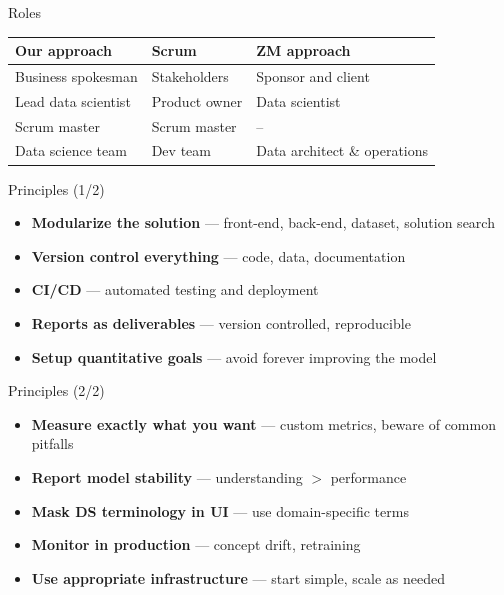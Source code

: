 \begin{frame}{Roles}
  \centering
  \small
  \begin{tabular}{lll}
    \toprule
    \textbf{Our approach} & \textbf{Scrum} & \textbf{ZM approach} \\
    \midrule
    Business spokesman  & Stakeholders  & Sponsor and client \\
    Lead data scientist & Product owner & Data scientist \\
    Scrum master        & Scrum master  & -- \\
    Data science team   & Dev team      & Data architect \& operations \\
    \bottomrule
  \end{tabular}
\end{frame}

\begin{frame}{Principles (1/2)}
  \begin{itemize}
    \item \textbf{Modularize the solution} --- front-end, back-end, dataset,
      solution search
    \item \textbf{Version control everything} --- code, data, documentation
    \item \textbf{CI/CD} --- automated testing and deployment
    \item \textbf{Reports as deliverables} --- version controlled, reproducible
    \item \textbf{Setup quantitative goals} --- avoid forever improving the model
  \end{itemize}
\end{frame}

\begin{frame}{Principles (2/2)}
  \begin{itemize}
    \item \textbf{Measure exactly what you want} --- custom metrics, beware of
      common pitfalls
    \item \textbf{Report model stability} --- understanding $>$ performance
    \item \textbf{Mask DS terminology in UI} --- use domain-specific terms
    \item \textbf{Monitor in production} --- concept drift, retraining
    \item \textbf{Use appropriate infrastructure} --- start simple, scale as needed
  \end{itemize}
\end{frame}

